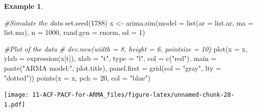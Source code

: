 \documentclass[
]{book}
\newenvironment{Shaded}{\begin{snugshade}}{\end{snugshade}}
\newcommand{\AttributeTok}[1]{\textcolor[rgb]{0.77,0.63,0.00}{#1}}
\newcommand{\CommentTok}[1]{\textcolor[rgb]{0.56,0.35,0.01}{\textit{#1}}}
\newcommand{\DecValTok}[1]{\textcolor[rgb]{0.00,0.00,0.81}{#1}}
\newcommand{\FunctionTok}[1]{\textcolor[rgb]{0.00,0.00,0.00}{#1}}
\newcommand{\NormalTok}[1]{#1}
\newcommand{\OtherTok}[1]{\textcolor[rgb]{0.56,0.35,0.01}{#1}}
\newcommand{\StringTok}[1]{\textcolor[rgb]{0.31,0.60,0.02}{#1}}
\theoremstyle{definition}
\theoremstyle{definition}
\newtheorem{example}{Example}[chapter]
\theoremstyle{definition}
\theoremstyle{definition}
\theoremstyle{remark}
\begin{document}
\begin{example}
\begin{Shaded}
\begin{Highlighting}[]
 \CommentTok{\#Simulate the data}
  \FunctionTok{set.seed}\NormalTok{(}\DecValTok{1788}\NormalTok{)}
\NormalTok{  x }\OtherTok{\textless{}{-}} \FunctionTok{arima.sim}\NormalTok{(}\AttributeTok{model =} \FunctionTok{list}\NormalTok{(}\AttributeTok{ar =}\NormalTok{ list.ar, }\AttributeTok{ma =}\NormalTok{ list.ma), }\AttributeTok{n =} \DecValTok{1000}\NormalTok{,}
    \AttributeTok{rand.gen =}\NormalTok{ rnorm, }\AttributeTok{sd =} \DecValTok{1}\NormalTok{)}
  
  
  \CommentTok{\#Plot of the data}
  \CommentTok{\# dev.new(width = 8, height = 6, pointsize = 10)}
  \FunctionTok{plot}\NormalTok{(}\AttributeTok{x =}\NormalTok{ x, }\AttributeTok{ylab =} \FunctionTok{expression}\NormalTok{(x[t]), }\AttributeTok{xlab =} \StringTok{"t"}\NormalTok{, }\AttributeTok{type =} \StringTok{"l"}\NormalTok{, }\AttributeTok{col =} \FunctionTok{c}\NormalTok{(}\StringTok{"red"}\NormalTok{),  }
    \AttributeTok{main =}  \FunctionTok{paste}\NormalTok{(}\StringTok{"ARMA model:"}\NormalTok{, plot.title),}
    \AttributeTok{panel.first =} \FunctionTok{grid}\NormalTok{(}\AttributeTok{col =} \StringTok{"gray"}\NormalTok{, }\AttributeTok{lty =} \StringTok{"dotted"}\NormalTok{))}
  \FunctionTok{points}\NormalTok{(}\AttributeTok{x =}\NormalTok{ x, }\AttributeTok{pch =} \DecValTok{20}\NormalTok{, }\AttributeTok{col =} \StringTok{"blue"}\NormalTok{)}
\end{Highlighting}
\end{Shaded}

\texttt{[image: 11-ACF-PACF-for-ARMA\_files/figure-latex/unnamed-chunk-28-1.pdf]}


\end{example}
\end{document}
